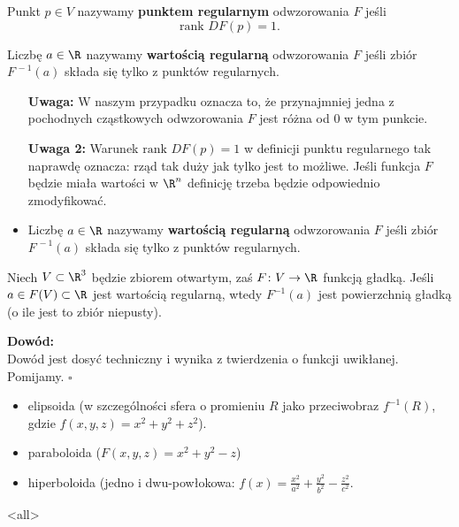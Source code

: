 \begin{definicja}
\item Punkt $p\in V$ nazywamy \textbf{punktem regularnym}  odwzorowania $F$ jeśli 
\[\text{rank }DF(p)=1.\]
\item Liczbę $a\in \R$ nazywamy \textbf{wartością regularną} odwzorowania $F$ jeśli zbiór $F^{\,-1}(a)$ składa się tylko z punktów regularnych.
\end{definicja}


\begin{itemize}
\item [\textbf{Uwaga:} ]W naszym przypadku oznacza to, że przynajmniej jedna z pochodnych cząstkowych odwzorowania $F$ jest różna od $0$ w tym punkcie.
\item [\textbf{Uwaga 2:} ]Warunek $\text{rank }DF(p)=1$ w definicji punktu regularnego tak naprawdę oznacza: rząd tak duży jak tylko jest to możliwe. Jeśli funkcja $F$ będzie miała wartości w $\R^n$ definicję trzeba będzie odpowiednio zmodyfikować. 
\item Liczbę $a\in \R$ nazywamy \textbf{wartością regularną} odwzorowania $F$ jeśli zbiór $F^{\,-1}(a)$ składa się tylko z punktów regularnych.
\end{itemize}
\begin{frame}

\begin{twierdzenie}Niech $V\subset \R^3$ będzie zbiorem otwartym, zaś $F\colon V\to \R$ funkcją gładką. Jeśli $a\in F(V)\subset \R$ jest wartością regularną, wtedy $F^{-1}(a)$ jest powierzchnią gładką 	(o ile jest to zbiór niepusty).
\end{twierdzenie}

\pause \textcolor{ared}{\textbf{Dowód:}}\\
Dowód jest dosyć techniczny i wynika z twierdzenia o funkcji uwikłanej. Pomijamy.
\hfill $\square$

\end{frame}
\begin{frame}

\begin{przyklad}
\begin{itemize}[<+->]
\item elipsoida (w szczególności sfera o promieniu $R$ jako przeciwobraz $f^{-1}(R)$, gdzie $f(x,y,z)=x^2+y^2+z^2$). 
\begin{center}

\end{center}

\item paraboloida ($F(x,y,z)=x^2+y^2-z$)
\item hiperboloida (jedno i dwu-powłokowa: $f(x)=\frac{x^2}{a^2}+\frac{y^2}{b^2}-\frac{z^2}{c^2}.$
\end{itemize}
\end{przyklad}

\end{frame}

\mode<all> 

